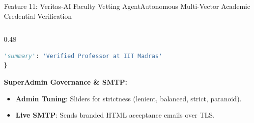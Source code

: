 \documentclass[aspectratio=169,10pt]{beamer}
\begin{document}
\begin{frame}[fragile,t]{Feature 11: Veritas-AI Faculty Vetting Agent}{Autonomous Multi-Vector Academic Credential Verification}
\begin{columns}[t]
\begin{column}{0.48\textwidth}
\begin{lstlisting}[language=Python]
    'summary': 'Verified Professor at IIT Madras'
}
\end{lstlisting}
      \vspace{0.08cm}
      {\fontsize{8.0}{10.0}\selectfont\textbf{\textcolor{KoinexaOrange}{SuperAdmin Governance \& SMTP:}}}
      \begin{itemize}\setlength{\itemsep}{0.8pt}
        \item {\fontsize{7.5}{9.2}\selectfont \textbf{Admin Tuning}: Sliders for strictness (lenient, balanced, strict, paranoid).}
        \item {\fontsize{7.5}{9.2}\selectfont \textbf{Live SMTP}: Sends branded HTML acceptance emails over TLS.}
      \end{itemize}
    \end{column}
  \end{columns}
\end{frame}
\end{document}
